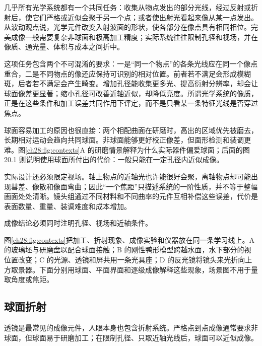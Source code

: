 几乎所有光学系统都有一个共同任务：收集从物点发出的部分光线，经过反射或折射后，使它们严格或近似会聚于另一个点；或者使出射光看起来像从某一点发出。从波动观点说，光学元件改变入射波面的形状，使各部分在像点具有相同相位。完美成像一般需要复杂非球面和极高加工精度；实际系统往往限制孔径和视场，并在像质、通光量、体积与成本之间折中。

这项任务包含两个不可混淆的要求：一是“同一个物点”的各条光线应在同一个像点重合，二是不同物点的像还应保持可识别的相对位置。前者若不满足会形成模糊斑，后者若不满足会产生畸变。增加孔径能收集更多光、提高衍射分辨率，却会让球面像差更显著；缩小孔径可改善近轴近似，却降低亮度。所谓光学系统的像质，正是在这些条件和加工误差共同作用下评定，而不是只看某一条特征光线是否穿过焦点。

球面容易加工的原因也很直接：两个相配曲面在研磨时，高出的区域优先被磨去，长期相对运动会趋向共同球面。非球面能够更好校正像差，但面形检测和装调更难。图\ref{ch28:fig:contexts}A 的研磨情景解释为什么实际器件偏爱球面；后面的图 20.1 则说明使用球面所付出的代价：一般只能在一定孔径内近似成像。

实际设计还必须限定视场。轴上物点的近轴光也许能很好会聚，离轴物点却可能出现彗差、像散和像面弯曲；因此“一个焦距”只描述系统的一阶性质，并不等于整幅画面处处清晰。镜头组通过不同材料和不同曲率的元件互相补偿这些误差，代价是表面数量、重量、装调难度和成本增加。

成像结论必须同时注明孔径、视场和近轴条件。


图\ref{ch28:fig:contexts}把加工、折射现象、成像实验和仪器放在同一条学习线上。A 的玻璃坯与研磨盘以配合球面接触；B 的刚性鸭形模型跨越水面，水下部分的视位置改变；C 的光源、透镜和屏共用一条光具座；D 的反光镜将镜头来光折向上方取景器。下面分别用球面、平面界面和逐级成像解释这些现象，场景图不用于量取角度或焦距。

\subsection*{球面折射}

透镜是最常见的成像元件，人眼本身也包含折射系统。严格点到点成像通常要求非球面，但球面易于研磨加工；在限制孔径、只取近轴光线后，球面可以近似成像。

